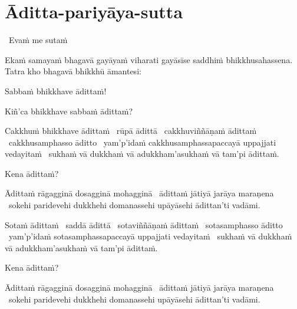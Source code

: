 \section{Āditta-pariyāya-sutta}
\label{aditta-pariyaya}

\begin{leader}
  \anglebracketleft\ \hspace{-0.5mm}Evaṁ me sutaṁ \hspace{-0.5mm}\anglebracketright\
\end{leader}

\begin{pali-hang}
  Ekaṁ samayaṁ bhagavā gayāyaṁ viharati gayāsīse saddhiṁ bhikkhusahassena. Tatra kho bhagavā bhikkhū āmantesi:
\end{pali-hang}

Sabbaṁ bhikkhave ādittaṁ!

Kiñ'ca bhikkhave sabbaṁ ādittaṁ?

\begin{pali-hang}
  Cakkhuṁ bhikkhave ādittaṁ \breathmark\ rūpā ādittā \breathmark\ cakkhuviññāṇaṁ ādittaṁ \breathmark\ cakkhusamphasso āditto \breathmark\ yam'p'idaṁ cakkhusamphassapaccayā uppajjati vedayitaṁ \breathmark\ sukhaṁ vā dukkhaṁ vā adukkham'asukhaṁ vā tam'pi ādittaṁ.
\end{pali-hang}
\begin{pali-hangtogether}
Kena ādittaṁ?
\end{pali-hangtogether}
\begin{pali-hangtogether}
  Ādittaṁ rāgagginā dosagginā mohagginā \breathmark\ ādittaṁ jātiyā jarāya maraṇena \breathmark\ sokehi paridevehi dukkhehi domanassehi upāyāsehi ādittan'ti vadāmi.
\end{pali-hangtogether}

\begin{pali-hang}
  Sotaṁ ādittaṁ \breathmark\ saddā ādittā \breathmark\ sotaviññāṇaṁ ādittaṁ \breathmark\ sotasamphasso āditto \breathmark\ yam'p'idaṁ sotasamphassapaccayā uppajjati vedayitaṁ \breathmark\ sukhaṁ vā dukkhaṁ vā adukkham'asukhaṁ vā tam'pi ādittaṁ.
\end{pali-hang}
\begin{pali-hangtogether}
Kena ādittaṁ?
\end{pali-hangtogether}
\begin{pali-hangtogether}
  Ādittaṁ rāgagginā dosagginā mohagginā \breathmark\ ādittaṁ jātiyā jarāya maraṇena \breathmark\ sokehi paridevehi dukkhehi domanassehi upāyāsehi ādittan'ti vadāmi.
\end{pali-hangtogether}

